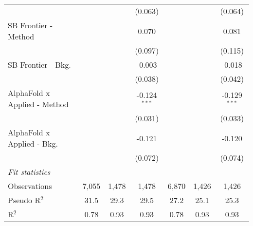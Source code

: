 \begin{tabular}{lcccccc}
                                &                &                & (0.063)        &                &                & (0.064)\\   
   SB Frontier - Method         &                &                & 0.070          &                &                & 0.081\\   
                                &                &                & (0.097)        &                &                & (0.115)\\   
   SB Frontier - Bkg.           &                &                & -0.003         &                &                & -0.018\\   
                                &                &                & (0.038)        &                &                & (0.042)\\   
   AlphaFold x Applied - Method &                &                & -0.124$^{***}$ &                &                & -0.129$^{***}$\\   
                                &                &                & (0.031)        &                &                & (0.033)\\   
   AlphaFold x Applied - Bkg.   &                &                & -0.121         &                &                & -0.120\\   
                                &                &                & (0.072)        &                &                & (0.074)\\   
   \midrule
   \emph{Fit statistics}\\
   Observations                 & 7,055          & 1,478          & 1,478          & 6,870          & 1,426          & 1,426\\  
   Pseudo R$^2$                 & 31.5           & 29.3           & 29.5           & 27.2           & 25.1           & 25.3\\  
   R$^2$                        & 0.78           & 0.93           & 0.93           & 0.78           & 0.93           & 0.93\\  
   

\end{tabular}
